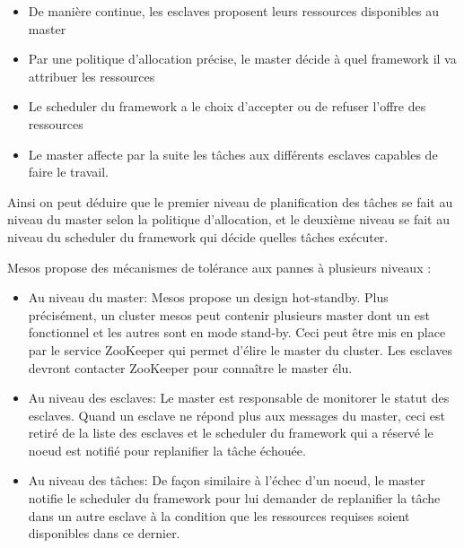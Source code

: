 \documentclass[a4paper, 11pt, titlepage]{article}
\begin{document}
\begin{itemize}

\item
De manière continue, les esclaves proposent leurs ressources disponibles au master

\item
Par une politique d'allocation précise, le master décide à quel framework il va attribuer les ressources

\item
Le scheduler du framework a le choix d'accepter ou de refuser l'offre des ressources

\item
Le master affecte par la suite les tâches aux différents esclaves capables de faire le travail.

\end{itemize}

Ainsi on peut déduire que le premier niveau de planification des tâches se fait au niveau du master selon la politique d'allocation, et le deuxième niveau se fait au niveau du scheduler du framework qui décide quelles tâches exécuter.


Mesos propose des mécanismes de tolérance aux pannes à plusieurs niveaux :

\begin{itemize}

\item
Au niveau du master: Mesos propose un design hot-standby. Plus précisément, un cluster mesos peut contenir plusieurs master dont un est fonctionnel et les autres sont en mode stand-by. Ceci peut être mis en place par le service ZooKeeper qui permet d'élire le master du cluster. Les esclaves devront contacter ZooKeeper pour connaître le master élu.


\item
Au niveau des esclaves: Le master est responsable de monitorer le statut des esclaves. Quand un esclave ne répond plus aux messages du master, ceci est retiré de la liste des esclaves et le scheduler du framework qui a réservé le noeud est notifié pour replanifier la tâche échouée.

\item
Au niveau des tâches: De façon similaire à l'échec d'un noeud, le master notifie le scheduler du framework pour lui demander de replanifier la tâche dans un autre esclave à la condition que les ressources requises soient disponibles dans ce dernier.

\end{itemize}
\end{document}

